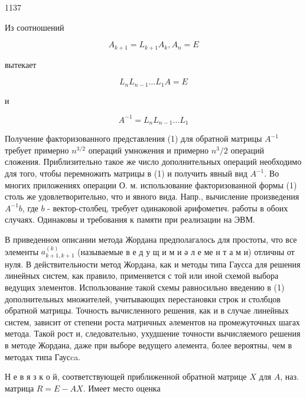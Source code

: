 \documentclass[10pt]{article}
\begin{document}
1137



Из соотношений



\[

A_{k+1}=L_{k+1} A_{k}, A_{n}=E

\]



вытекает



\[

L_{n} L_{n-1} \ldots L_{1} A=E

\]



и



\[

A^{-1}=L_{n} L_{n-1} \ldots L_{1}

\]



Получение факторизованного представления (1) для обратной матрицы $A^{-1}$ требует примерно $n^{3 / 2}$ операций умножения и примерно $n^{3} / 2$ операций сложения. Приблизительно такое же число дополнительных операций необходимо для того, чтобы перемножить матрицы в (1) и получить явный вид $A^{-1}$. Во многих приложениях операции О. м. использование факторизованной формы (1) столь же удовлетворительно, что и явного вида. Напр., вычисление произведения $A^{-1} b$, где $b$ - вектор-столбец, требует одинаковой арифометич. работы в обоих случаях. Одинаковы и требования к памяти при реализации на ЭВМ.



В приведенном описании метода Жордана предполагалось для простоты, что все элементы $a_{k+1, k+1}^{(k)}$ (называемые в е д у щ и м и ә л е ме н т а м и) отличны от нуля. В действительности метод Жордана, как и методы типа Гаусса для решения линейных систем, как правило, применяется с той или иной схемой выбора ведущих элементов. Использование такой схемы равносильно введению в (1) дополнительных множителей, учитывающих перестановки строк и столбцов обратной матрицы. Точность вычисленного решения, как и в случае линейных систем, зависит от степени роста матричных әлементов на промежуточных шагах метода. Такой рост и, следовательно, ухудшение точности вычисляемого решения в методе Жордана, даже при выборе ведущего әлемента, более вероятны, чем в методах типа Гаусca.



Н е в я з к о й, соответствующей приближенной обратной матрице $X$ для $A$, наз. матрица $R=E-A X$. Имеет место оценка
\end{document}
